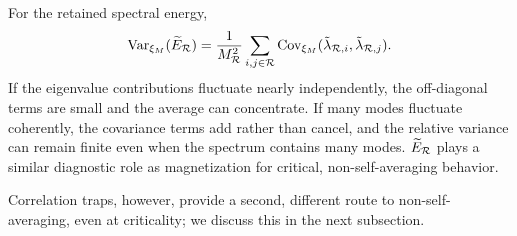 For the retained spectral energy,
\begin{equation}
\operatorname{Var}_{\xi_M}(\widetilde E_{\mathcal R})
=
\frac{1}{M_{\mathcal R}^{2}}
\sum_{i,j\in\mathcal R}
\operatorname{Cov}_{\xi_M}(\tilde{\lambda}_{\mathcal R,i},\tilde{\lambda}_{\mathcal R,j}).
\label{eq:spectral_energy_covariance}
\end{equation}
If the eigenvalue contributions fluctuate nearly independently, the
off-diagonal terms are small and the average can concentrate. If many modes
fluctuate coherently, the covariance terms add rather than cancel, and the
relative variance can remain finite even when the spectrum contains many
modes. $\widetilde E_{\mathcal R}$ plays a similar diagnostic role as magnetization
for critical, non-self-averaging behavior.

Correlation traps, however, provide a second, different
route to non-self-averaging, even at criticality; we discuss this in the next subsection.


\clearpage

